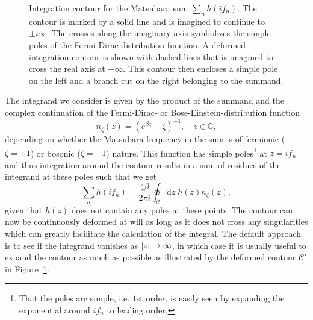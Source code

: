 \begin{figure}[h]
\caption{Integration contour for the Matsubara sum $\sum_nh(if_n)$. The contour is marked by a solid line and is imagined to continue
to $\pm i\infty$.
The crosses along the imaginary axis symbolizes the simple poles of the Fermi-Dirac distribution-function.
A deformed integration contour is shown with dashed lines that is imagined to cross the real axis at $\pm\infty$.
This contour then encloses a simple pole on the left and a branch cut on the right belonging to the summand.}
  \label{fig:Field:Mats:integrationContour}
\end{figure}
%
The integrand we consider is given by the product of the summand
and the complex continuation of the Fermi-Dirac- or Bose-Einstein-distribution function
\begin{equation}
    \label{eq:Field:Mats:distributionFunction}
    n_\zeta(z) = (e^{\beta z} - \zeta)^{-1},\quad z\in\mathbb{C},
\end{equation}
depending on whether the Matsubara
frequency in the sum is of fermionic ($\zeta = +1$) or bosonic ($\zeta = -1$) nature. This function has simple poles\footnote{That
the poles are simple, i.e. $1$st order, is easily seen by expanding the exponential around $if_n$ to leading order.} %
 at $z = if_n$ and thus integration
around the contour results in a sum of residues of the integrand at these poles such that we get
\begin{equation}
    \label{eq:Field:Mats:sumToIntegral}
    \sum_nh(if_n) = \frac{\zeta\beta}{2\pi i}\oint_{\mathcal{C}}\!\mathrm{d}z\;h(z)n_\zeta(z),
\end{equation}
given that $h(z)$ does not contain any poles at these points. The contour can now be continuously deformed at will as long as it does not cross any
singularities which can greatly facilitate the calculation of the integral. The default approach is to see if the integrand vanishes as $\lvert z \rvert\to\infty$,
in which case it is usually useful to expand the contour as much as possible as illustrated by the deformed contour $\mathcal{C}'$ in
Figure~\ref{fig:Field:Mats:integrationContour}. 


